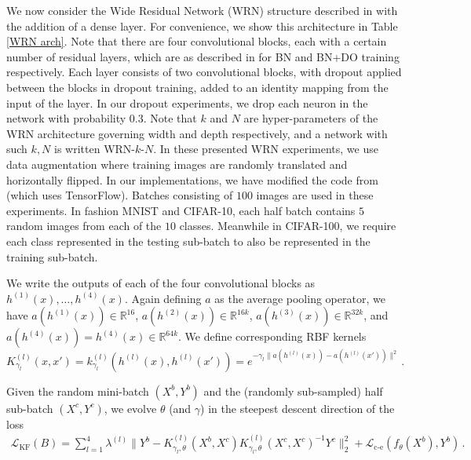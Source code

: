 \documentclass[11pt]{article}
\def\R{\mathbb{R}}
\def\L{\mathcal{L}}
\begin{document}
We now consider the Wide Residual Network (WRN) structure  described in \cite[Table 1]{WRNZagKom} with the addition of a dense layer.  For convenience, we show this architecture in Table \ref{WRN arch}.  Note that there are four convolutional blocks, each with a certain number of residual layers, which are as described in \cite[Fig. 1c,d]{WRNZagKom} for BN and BN+DO training respectively.  Each layer consists of two convolutional blocks, with dropout applied between the blocks in dropout training, added to an identity mapping from the input of the layer.  In our dropout experiments, we drop each neuron in the network with probability $0.3$.  Note that $k$ and $N$ are hyper-parameters of the WRN architecture governing width and depth respectively, and a network with such $k, N$ is written WRN-$k$-$N$.  In these presented WRN experiments, we use data augmentation where training images are randomly translated and horizontally flipped.  In our implementations, we have modified the code from \cite{WRNTF} (which uses TensorFlow).  Batches consisting of $100$ images are used in these experiments.  In fashion MNIST and CIFAR-10, each half batch contains $5$ random images from each of the $10$ classes.  Meanwhile in CIFAR-100, we require each class represented in the testing sub-batch to also be represented in the training sub-batch. 

We write the outputs of each of the four convolutional blocks as $h^{(1)}(x), \dots, h^{(4)}(x)$.  Again defining $a$ as the average pooling operator, we have $a(h^{(1)}(x)) \in \R^{16}$, $a(h^{(2)}(x))\in \R^{16k}$, $a(h^{(3)}(x))\in\R^{32k}$, and $a(h^{(4)}(x)) = h^{(4)}(x)\in\R^{64k}$.  We define corresponding RBF kernels
\begin{equation}
    K^{(l)}_{\gamma_l}(x, x') = k^{(l)}_{\gamma_l} (h^{(l)}(x), h^{(l)}(x')) = e^{-\gamma_l \| a(h^{(l)}(x)) - a(h^{(l)}(x')) \|^2}\, .
\end{equation}


Given the random mini-batch $(X^b,Y^b)$ and the (randomly sub-sampled) half sub-batch $(X^c,Y^c)$, we evolve $\theta$ (and $\gamma$) in the steepest descent direction of the loss
{\small
\begin{equation}\label{KFlossWRN}
\begin{split}
   \L_\text{KF}(B) = \sum_{l=1}^4\lambda^{(l)} \|Y^b - K^{(l)}_{\gamma_l,\theta}(X^b,X^c) K^{(l)}_{\gamma_l,\theta}(X^c,X^c)^{-1} Y^c\|_2^2  + \L_\text{c-e}(f_\theta(X^b), Y^b)\, .
\end{split}
\end{equation}}
\end{document}
